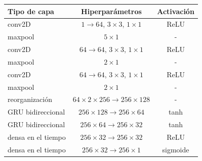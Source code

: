 \begin{tabular}{lcc}
\toprule
\textbf{Tipo de capa} & \textbf{Hiperparámetros} & \textbf{Activación} \\
\midrule
conv2D & $1 \to 64$, $3 \times 3$, $1 \times 1$ & ReLU \\
maxpool & $5 \times 1$ & - \\
conv2D & $64 \to 64$, $3 \times 3$, $1 \times 1$ & ReLU \\
maxpool & $2 \times 1$ & - \\
conv2D & $64 \to 64$, $3 \times 3$, $1 \times 1$ & ReLU \\
maxpool & $2 \times 1$ & - \\
reorganización & $64 \times 2 \times 256 \to 256 \times 128$ & - \\
GRU bidireccional & $256 \times 128 \to 256 \times 64$ & tanh \\
GRU bidireccional & $256 \times 64 \to 256 \times 32$ & tanh \\
densa en el tiempo & $256 \times 32 \to 256 \times 32$ & ReLU \\
densa en el tiempo & $256 \times 32 \to 256 \times 1$ & sigmoide \\
\bottomrule
\end{tabular}
